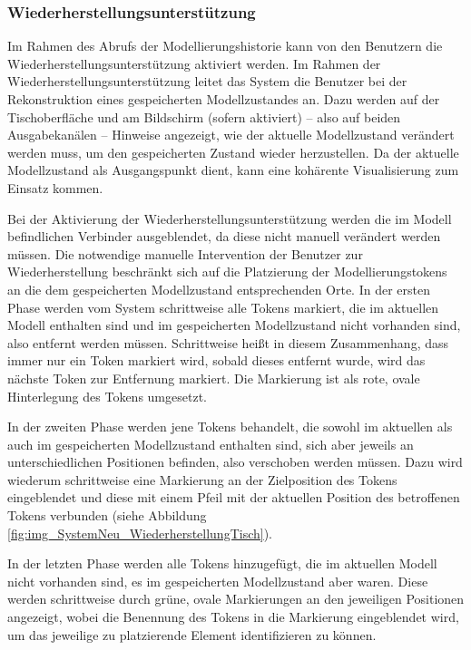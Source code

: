 \subsubsection{Wiederherstellungsunterstützung} %
\label{ssub:wiederherstellungsunterstützung}

Im Rahmen des Abrufs der Modellierungshistorie kann von den Benutzern die Wiederherstellungsunterstützung aktiviert werden. Im Rahmen der Wiederherstellungsunterstützung leitet das System die Benutzer bei der Rekonstruktion eines gespeicherten Modellzustandes an. Dazu werden auf der Tischoberfläche und am Bildschirm (sofern aktiviert) -- also auf beiden Ausgabekanälen -- Hinweise angezeigt, wie der aktuelle Modellzustand verändert werden muss, um den gespeicherten Zustand wieder herzustellen. Da der aktuelle Modellzustand als Ausgangspunkt dient, kann eine kohärente Visualisierung zum Einsatz kommen.

Bei der Aktivierung der Wiederherstellungsunterstützung werden die im Modell befindlichen Verbinder ausgeblendet, da diese nicht manuell verändert werden müssen. Die notwendige manuelle Intervention der Benutzer zur Wiederherstellung beschränkt sich auf die Platzierung der Modellierungstokens an die dem gespeicherten Modellzustand entsprechenden Orte. In der ersten Phase werden vom System schrittweise alle Tokens markiert, die im aktuellen Modell enthalten sind und im gespeicherten Modellzustand nicht vorhanden sind, also entfernt werden müssen. Schrittweise heißt in diesem Zusammenhang, dass immer nur ein Token markiert wird, sobald dieses entfernt wurde, wird das nächste Token zur Entfernung markiert. Die Markierung ist als rote, ovale Hinterlegung des Tokens umgesetzt.

In der zweiten Phase werden jene Tokens behandelt, die sowohl im aktuellen als auch im gespeicherten Modellzustand enthalten sind, sich aber jeweils an unterschiedlichen Positionen befinden, also verschoben werden müssen. Dazu wird wiederum schrittweise eine Markierung an der Zielposition des Tokens eingeblendet und diese mit einem Pfeil mit der aktuellen Position des betroffenen Tokens verbunden (siehe Abbildung \ref{fig:img_SystemNeu_WiederherstellungTisch}).

In der letzten Phase werden alle Tokens hinzugefügt, die im aktuellen Modell nicht vorhanden sind, es im gespeicherten Modellzustand aber waren. Diese werden schrittweise durch grüne, ovale Markierungen an den jeweiligen Positionen angezeigt, wobei die Benennung des Tokens in die Markierung eingeblendet wird, um das jeweilige zu platzierende Element identifizieren zu können.

